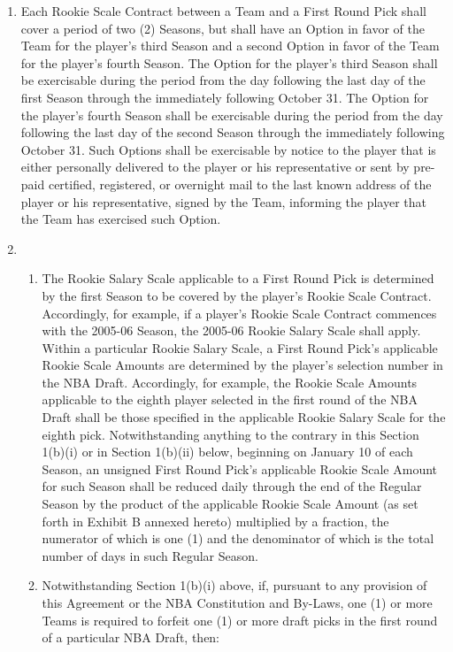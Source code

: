 \documentclass[
]{book}
\providecommand{\tightlist}{%
  \setlength{\itemsep}{0pt}\setlength{\parskip}{0pt}}
\begin{document}
\begin{enumerate}
\def\labelenumi{(\alph{enumi})}
\item
  Each Rookie Scale Contract between a Team and a First Round Pick shall cover a period of two (2) Seasons, but shall have an Option in favor of the Team for the player's third Season and a second Option in favor of the Team for the player's fourth Season. The Option for the player's third Season shall be exercisable during the period from the day following the last day of the first Season through the immediately following October 31. The Option for the player's fourth Season shall be exercisable during the period from the day following the last day of the second Season through the immediately following October 31. Such Options shall be exercisable by notice to the player that is either personally delivered to the player or his representative or sent by pre-paid certified, registered, or overnight mail to the last known address of the player or his representative, signed by the Team, informing the player that the Team has exercised such Option.
\item
  \begin{enumerate}
  \def\labelenumii{(\roman{enumii})}
  \tightlist
  \item
    The Rookie Salary Scale applicable to a First Round Pick is determined by the first Season to be covered by the player's Rookie Scale Contract. Accordingly, for example, if a player's Rookie Scale Contract commences with the 2005-06 Season, the 2005-06 Rookie Salary Scale shall apply. Within a particular Rookie Salary Scale, a First Round Pick's applicable Rookie Scale Amounts are determined by the player's selection number in the NBA Draft. Accordingly, for example, the Rookie Scale Amounts applicable to the eighth player selected in the first round of the NBA Draft shall be those specified in the applicable Rookie Salary Scale for the eighth pick. Notwithstanding anything to the contrary in this Section 1(b)(i) or in Section 1(b)(ii) below, beginning on January 10 of each Season, an unsigned First Round Pick's applicable Rookie Scale Amount for such Season shall be reduced daily through the end of the Regular Season by the product of the applicable Rookie Scale Amount (as set forth in Exhibit B annexed hereto) multiplied by a fraction, the numerator of which is one (1) and the denominator of which is the total number of days in such Regular Season.
  \item
    Notwithstanding Section 1(b)(i) above, if, pursuant to any provision of this Agreement or the NBA Constitution and By-Laws, one (1) or more Teams is required to forfeit one (1) or more draft picks in the first round of a particular NBA Draft, then:

\end{enumerate}
\end{enumerate}
\end{document}
